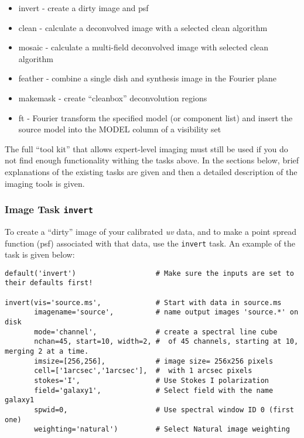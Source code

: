 \begin{itemize}
   \item invert - create a dirty image and psf
   \item clean - calculate a deconvolved image with a selected clean
     algorithm 
   \item mosaic - calculate a multi-field deconvolved image with
     selected clean algorithm 
   \item feather - combine a single dish and synthesis image in the
     Fourier plane 
   \item makemask - create ``cleanbox'' deconvolution regions
   \item ft - Fourier transform the specified model (or component
     list) and insert the source model into the MODEL column of a
     visibility set 
\end{itemize}

The full ``tool kit'' that allows expert-level imaging must still be
used if you do not find enough functionality withing the tasks above.  
In the sections below, brief explanations of the existing tasks are
given and then a detailed description of the imaging tools is given.  

\subsubsection{Image Task {\tt invert}}

To create a ``dirty'' image of your calibrated {\it uv} data, and to
make a point spread function (psf) associated with that data, use the
{\tt invert} task.  An example of the task is given below: 

\small
\begin{verbatim}
default('invert')                   # Make sure the inputs are set to their defaults first!

invert(vis='source.ms',             # Start with data in source.ms
       imagename='source',          # name output images 'source.*' on disk
       mode='channel',              # create a spectral line cube
       nchan=45, start=10, width=2, #  of 45 channels, starting at 10, merging 2 at a time. 
       imsize=[256,256],            # image size= 256x256 pixels
       cell=['1arcsec','1arcsec'],  #  with 1 arcsec pixels
       stokes='I',                  # Use Stokes I polarization
       field='galaxy1',             # Select field with the name galaxy1
       spwid=0,                     # Use spectral window ID 0 (first one)
       weighting='natural')         # Select Natural image weighting
\end{verbatim}
\normalsize

